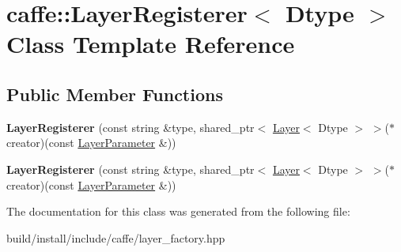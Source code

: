 \hypertarget{classcaffe_1_1_layer_registerer}{}\section{caffe\+:\+:Layer\+Registerer$<$ Dtype $>$ Class Template Reference}
\label{classcaffe_1_1_layer_registerer}
\subsection*{Public Member Functions}
\begin{DoxyCompactItemize}
\item 
\mbox{\label{classcaffe_1_1_layer_registerer_aa4c1f10f5e2ceb65e5be3e1970ce6bde}} 
{\bfseries Layer\+Registerer} (const string \&type, shared\+\_\+ptr$<$ \mbox{\hyperlink{classcaffe_1_1_layer}{Layer}}$<$ Dtype $>$ $>$($\ast$creator)(const \mbox{\hyperlink{classcaffe_1_1_layer_parameter}{Layer\+Parameter}} \&))
\item 
\mbox{\label{classcaffe_1_1_layer_registerer_aa4c1f10f5e2ceb65e5be3e1970ce6bde}} 
{\bfseries Layer\+Registerer} (const string \&type, shared\+\_\+ptr$<$ \mbox{\hyperlink{classcaffe_1_1_layer}{Layer}}$<$ Dtype $>$ $>$($\ast$creator)(const \mbox{\hyperlink{classcaffe_1_1_layer_parameter}{Layer\+Parameter}} \&))
\end{DoxyCompactItemize}


The documentation for this class was generated from the following file\+:\begin{DoxyCompactItemize}
\item 
build/install/include/caffe/layer\+\_\+factory.\+hpp\end{DoxyCompactItemize}
